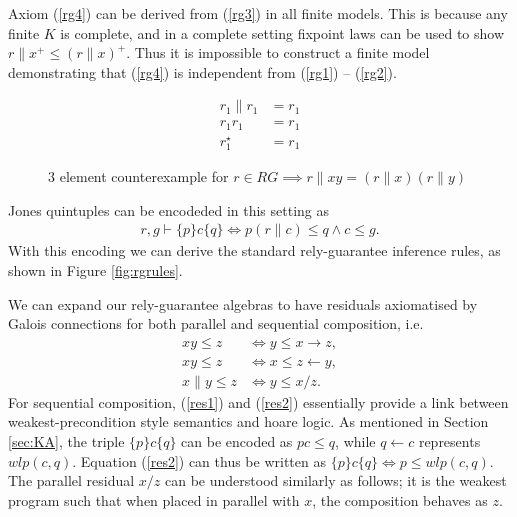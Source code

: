 \documentclass{llncs}
\begin{document}
Axiom (\ref{rg4}) can be derived from (\ref{rg3}) in all finite
models. This is because any finite $K$ is complete, and in a complete
setting fixpoint laws can be used to show $r\|x^+ \le (r\|x)^+$. Thus
it is impossible to construct a finite model demonstrating that
(\ref{rg4}) is independent from (\ref{rg1}) -- (\ref{rg2}).

\begin{figure}[t]
\centering
\begin{minipage}{0.24\textwidth}
\end{minipage}
\begin{minipage}{0.24\textwidth}
\begin{align*}
r_1 \| r_1 &= r_1\\
r_1 r_1 &= r_1\\
r_1^\star &= r_1
\end{align*}
\end{minipage}
\caption{3 element counterexample for $r \in RG \implies r\|xy = (r\|x)(r\|y)$}
\label{fig:rg3}
\end{figure}

Jones quintuples can be encodeded in this setting as
\begin{align}
r, g \vdash \{p\} c \{q\} \iff p(r\|c) \le q \land c \le g.
\end{align}
With this encoding we can derive the standard rely-guarantee inference rules, as
shown in Figure \ref{fig:rgrules}.

We can expand our rely-guarantee algebras to have residuals
axiomatised by Galois connections for both parallel and sequential
composition, i.e.
\begin{align}
xy \le z &\iff y \le x \rightarrow z, \label{res1}\\
xy \le z &\iff x \le z \leftarrow y, \label{res2}\\
x\|y \le z &\iff y \le x/z \label{res3}.
\end{align}
For sequential composition, (\ref{res1}) and (\ref{res2}) essentially
provide a link between weakest-precondition style semantics and hoare
logic. As mentioned in Section \ref{sec:KA}, the triple $\{p\} c
\{q\}$ can be encoded as $pc \le q$, while $q \leftarrow c$ represents
$wlp(c,q)$. Equation (\ref{res2}) can thus be written as $\{p\} c
\{q\} \iff p \le wlp(c,q)$. The parallel residual $x/z$ can be
understood similarly as follows; it is the weakest program such that
when placed in parallel with $x$, the composition behaves as $z$.
\end{document}
